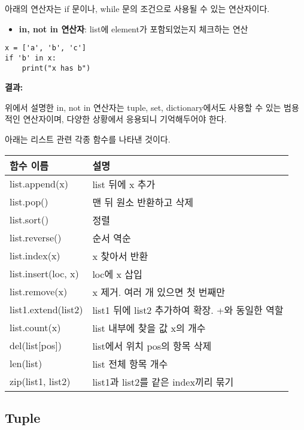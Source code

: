 아래의 연산자는 if 문이나, while 문의 조건으로 사용될 수 있는 연산자이다.

\begin{itemize}
\item \textbf{in, not in 연산자}: list에 element가 포함되었는지 체크하는 연산
\end{itemize}

\begin{minipage}{\textwidth}
\begin{tcolorbox}[colframe=black, colback=white]
\begin{verbatim}
x = ['a', 'b', 'c']
if 'b' in x:
    print("x has b")
\end{verbatim}
\end{tcolorbox}
\textbf{결과: }
\end{minipage}

위에서 설명한 in, not in 연산자는 tuple, set, dictionary에서도 사용할 수 있는 범용적인 연산자이며, 다양한 상황에서 응용되니 기억해두어야 한다.

아래는 리스트 관련 각종 함수를 나타낸 것이다.

\begin{longtable}[]{@{}p{4cm} p{10cm}@{}}
    \toprule
    함수 이름 & 설명 \\
    \midrule
    \endhead
    list.append(x) & list 뒤에 x 추가 \\
    list.pop() & 맨 뒤 원소 반환하고 삭제 \\
    list.sort() & 정렬 \\
    list.reverse() & 순서 역순 \\
    list.index(x) & x 찾아서 반환 \\
    list.insert(loc, x) & loc에 x 삽입 \\
    list.remove(x) & x 제거. 여러 개 있으면 첫 번째만 \\
    list1.extend(list2) & list1 뒤에 list2 추가하여 확장. +와 동일한 역할 \\
    list.count(x) & list 내부에 찾을 값 x의 개수 \\
    del(list{[}pos{]}) & list에서 위치 pos의 항목 삭제 \\
    len(list) & list 전체 항목 개수 \\
    zip(list1, list2) & list1과 list2를 같은 index끼리 묶기 \\
    \bottomrule
\end{longtable}

\subsection{Tuple}

